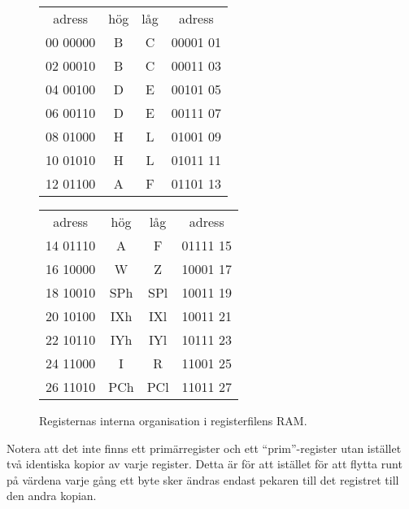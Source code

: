 \documentclass[main.tex]{subfiles}
\begin{document}
\begin{figure}[b]
    \center
    \ttfamily\arraybackslash
    \begin{tabular}{r|c|c|l}
        \multicolumn{1}{c}{\normalfont adress} &
        \multicolumn{1}{c}{\normalfont hög} &
        \multicolumn{1}{c}{\normalfont låg} &
        \multicolumn{1}{c}{\normalfont adress} \\ \cline{2-3}
        00 00000 & B   & C   & 00001 01 \\ \cline{2-3}
        02 00010 & B   & C   & 00011 03 \\ \cline{2-3}
        04 00100 & D   & E   & 00101 05 \\ \cline{2-3}
        06 00110 & D   & E   & 00111 07 \\ \cline{2-3}
        08 01000 & H   & L   & 01001 09 \\ \cline{2-3}
        10 01010 & H   & L   & 01011 11 \\ \cline{2-3}
        12 01100 & A   & F   & 01101 13 \\ \cline{2-3}
    \end{tabular}
    \begin{tabular}{r|c|c|l}
        \multicolumn{1}{c}{\normalfont adress} &
        \multicolumn{1}{c}{\normalfont hög} &
        \multicolumn{1}{c}{\normalfont låg} &
        \multicolumn{1}{c}{\normalfont adress} \\ \cline{2-3}
        14 01110 & A   & F   & 01111 15 \\ \cline{2-3}
        16 10000 & W   & Z   & 10001 17 \\ \cline{2-3}
        18 10010 & SPh & SPl & 10011 19 \\ \cline{2-3}
        20 10100 & IXh & IXl & 10011 21 \\ \cline{2-3}
        22 10110 & IYh & IYl & 10111 23 \\ \cline{2-3}
        24 11000 & I   & R   & 11001 25 \\ \cline{2-3}
        26 11010 & PCh & PCl & 11011 27 \\ \cline{2-3}
    \end{tabular}
    \caption{Registernas interna organisation i registerfilens RAM.}
    \label{fig:rfint}
\end{figure}

Notera att det inte finns ett primärregister och ett ``prim''-register utan
istället två identiska kopior av varje register. Detta är för att istället för
att flytta runt på värdena varje gång ett byte sker ändras endast pekaren
till det registret till den andra kopian.
\end{document}
